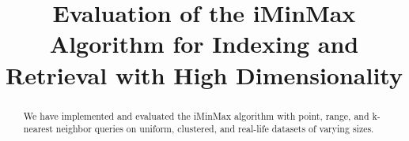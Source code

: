 \documentclass[conference]{IEEEtran}
\begin{document}
%
\title{Evaluation of the iMinMax Algorithm for Indexing and Retrieval with High Dimensionality}



% 
\author{
}






\maketitle


\begin{abstract}
We have implemented and evaluated the iMinMax algorithm with point, range, and k-nearest neighbor queries on uniform, clustered, and real-life datasets of varying sizes.
\end{abstract}





%
\IEEEpeerreviewmaketitle
\end{document}
